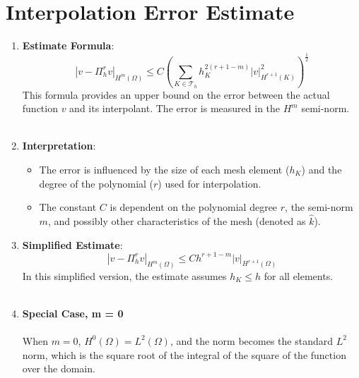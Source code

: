 \documentclass[11pt]{book}
\begin{document}
\section{Interpolation Error Estimate}
\begin{enumerate}
\item \textbf{Estimate Formula}:
   \begin{equation}
   \left|v-\Pi_{h}^{r} v\right|_{H^{m}(\Omega)} \leq C\left(\sum_{K \in \mathcal{T}_{h}} h_{K}^{2(r+1-m)}|v|_{H^{r+1}(K)}^{2}\right)^{\frac{1}{2}}
   \end{equation}
   This formula provides an upper bound on the error between the actual function \( v \) and its interpolant. The error is measured in the \( H^m \) semi-norm. \\ \\

\item \textbf{Interpretation}:
   \begin{itemize} 
   \item The error is influenced by the size of each mesh element (\( h_K \)) and the degree of the polynomial (\( r \)) used for interpolation.
   \item The constant \( C \) is dependent on the polynomial degree \( r \), the semi-norm \( m \), and possibly other characteristics of the mesh (denoted as \( \hat{k} \)).
   \end{itemize}

\item \textbf{Simplified Estimate}:
   \begin{equation}
   \left|v-\Pi_{h}^{r} v\right|_{H^{m}(\Omega)} \leq C h^{r+1-m}|v|_{H^{r+1}(\Omega)}
   \end{equation}
   In this simplified version, the estimate assumes \( h_K \leq h \) for all elements. \\ \\

\item \textbf{Special Case, m = 0}\\ \\
   When \( m=0 \), \( H^{0}(\Omega) = L^{2}(\Omega) \), and the norm becomes the standard \( L^2 \) norm, which is the square root of the integral of the square of the function over the domain.
\end{enumerate}
\end{document}
